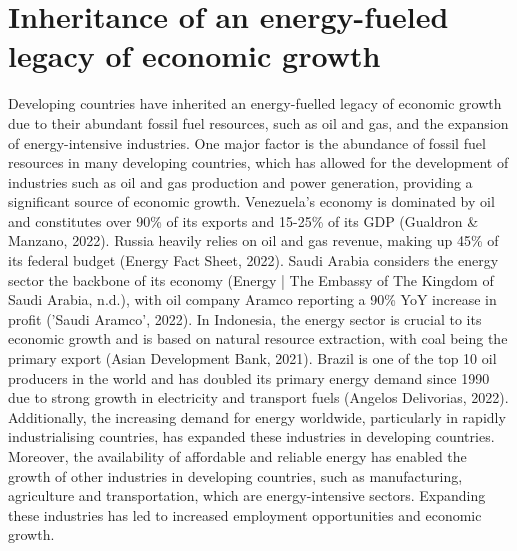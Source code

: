 \documentclass[11pt,a4paper]{article}
\begin{document}
\section*{Inheritance of an energy-fueled legacy of economic growth}
Developing countries have inherited an energy-fuelled legacy of economic growth due to their abundant fossil fuel resources, such as oil and gas, and the expansion of energy-intensive industries. One major factor is the abundance of fossil fuel resources in many developing countries, which has allowed for the development of industries such as oil and gas production and power generation, providing a significant source of economic growth. Venezuela's economy is dominated by oil and constitutes over 90\% of its exports and 15-25\% of its GDP (Gualdron \& Manzano, 2022). Russia heavily relies on oil and gas revenue, making up 45\% of its federal budget (Energy Fact Sheet, 2022). Saudi Arabia considers the energy sector the backbone of its economy (Energy | The Embassy of The Kingdom of Saudi Arabia, n.d.), with oil company Aramco reporting a 90\% YoY increase in profit ('Saudi Aramco', 2022). In Indonesia, the energy sector is crucial to its economic growth and is based on natural resource extraction, with coal being the primary export (Asian Development Bank, 2021). Brazil is one of the top 10 oil producers in the world and has doubled its primary energy demand since 1990 due to strong growth in electricity and transport fuels (Angelos Delivorias, 2022).
Additionally, the increasing demand for energy worldwide, particularly in rapidly industrialising countries, has expanded these industries in developing countries. Moreover, the availability of affordable and reliable energy has enabled the growth of other industries in developing countries, such as manufacturing, agriculture and transportation, which are energy-intensive sectors. Expanding these industries has led to increased employment opportunities and economic growth. 

\newpage
\end{document}
